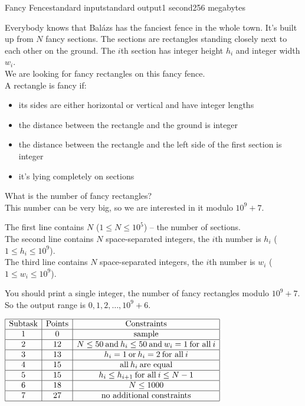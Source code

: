 \begin{problem}{Fancy Fence}{standard input}{standard output}{1 second}{256 megabytes}

Everybody knows that Balázs has the fanciest fence in the whole town. It's built up from $N$ fancy sections. The sections are rectangles standing closely next to each other on the ground.
The $i$th section has integer height $h_i$ and integer width $w_i$.\\
We are looking for fancy rectangles on this fancy fence.\\
A rectangle is fancy if:
\begin{itemize}
\item its sides are either horizontal or vertical and have integer lengths
\item the distance between the rectangle and the ground is integer
\item the distance between the rectangle and the left side of the first section is integer
\item it's lying completely on sections
\end{itemize}
What is the number of fancy rectangles?\\
This number can be very big, so we are interested in it modulo $10^9+7$.

\InputFile
The first line contains $N$ ($1\leq N \leq 10^{5}$) -- the number of sections.\\
The second line contains $N$ space-separated integers, the $i$th number is $h_i$ ($1 \leq h_i \leq 10^{9}$).\\
The third line contains $N$ space-separated integers, the $i$th number is $w_i$ ($1 \leq w_i \leq 10^{9}$).

\OutputFile
You should print a single integer, the number of fancy rectangles modulo $10^9+7$. So the output range is $0,1,2,\ldots, 10^9+6$.

\Scoring
\begin{center}
$
\begin{array}{|c|c|c|} 
    \hline \text{Subtask} & \text{Points} & \text{Constraints}  \\
    \hline 1 & 0 & \text{sample}\\
    \hline 2 & 12 & N \leq 50 \: \text{and} \: h_i \leq 50 \: \text{and} \: w_i = 1 \: \text{for all} \: i \\
    \hline 3 & 13 & h_i = 1 \: \text{or} \: h_i = 2 \: \text{for all} \: i \\
    \hline 4 & 15 & \text{all} \: h_i \: \text{are equal} \\
    \hline 5 & 15 & h_i \leq h_{i+1} \: \text{for all} \: i \leq N-1 \\
    \hline 6 & 18 & N \leq 1000\\
    \hline 7 & 27 & \text{no additional constraints}\\
    \hline
\end{array}
$


\end{center}
\end{problem}
